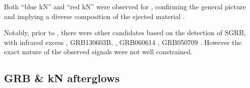 Both ``blue \ac{kN}'' and ``red \ac{kN}'' were observed for \GW{}, confirming the general 
picture and implying a diverse composition of the ejected material
\citep{Arcavi:2017xiz,Coulter:2017wya,Drout:2017ijr,Evans:2017mmy,Hallinan:2017woc,
    Kasliwal:2017ngb,Nicholl:2017ahq,Smartt:2017fuw,Soares-santos:2017lru,Tanvir:2017pws,
    Troja:2017nqp,Mooley:2018dlz,Ruan:2017bha,Lyman:2018qjg}.

%
% 
Notably, prior to \AT{}, there were other candidates based on the detection of \ac{SGRB}, 
with infrared excess \eg, 
GRB130603B, \citep{Berger:2013wna,Tanvir:2013pia}, 
GRB060614 \citep{Jin:2015txa,Yang:2015pha}, 
GRB050709 \citep{Jin:2016pnm}.
However the exact nature of the observed signals were not well constrained. 
%






\subsection{\ac{GRB} \& \ac{kN} afterglows} \label{sec:intro:afterglow}

